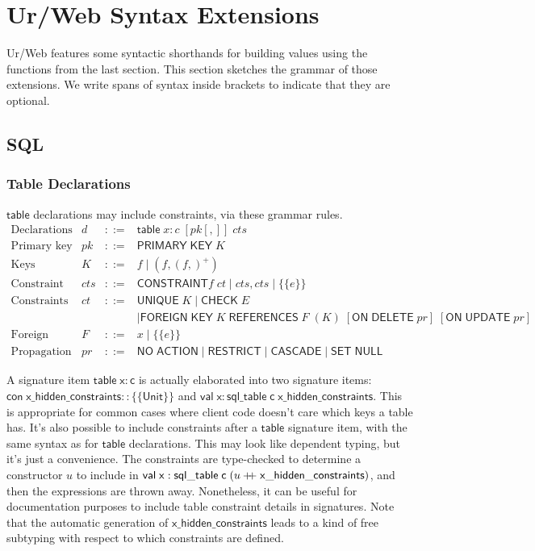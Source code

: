\documentclass{article}
\newcommand{\mt}[1]{\mathsf{#1}}
\newcommand{\rc}{+ \hspace{-.075in} + \;}
\begin{document}
\section{Ur/Web Syntax Extensions}

Ur/Web features some syntactic shorthands for building values using the functions from the last section.  This section sketches the grammar of those extensions.  We write spans of syntax inside brackets to indicate that they are optional.

\subsection{SQL}

\subsubsection{\label{tables}Table Declarations}

$\mt{table}$ declarations may include constraints, via these grammar rules.
$$\begin{array}{rrcll}
  \textrm{Declarations} & d &::=& \mt{table} \; x : c \; [pk[,]] \; cts \\
  \textrm{Primary key constraints} & pk &::=& \mt{PRIMARY} \; \mt{KEY} \; K \\
  \textrm{Keys} & K &::=& f \mid (f, (f,)^+) \\
  \textrm{Constraint sets} & cts &::=& \mt{CONSTRAINT} f \; ct \mid cts, cts \mid \{\{e\}\} \\
  \textrm{Constraints} & ct &::=& \mt{UNIQUE} \; K \mid \mt{CHECK} \; E \\
  &&& \mid \mt{FOREIGN} \; \mt{KEY} \; K \; \mt{REFERENCES} \; F \; (K) \; [\mt{ON} \; \mt{DELETE} \; pr] \; [\mt{ON} \; \mt{UPDATE} \; pr] \\
  \textrm{Foreign tables} & F &::=& x \mid \{\{e\}\} \\
  \textrm{Propagation modes} & pr &::=& \mt{NO} \; \mt{ACTION} \mid \mt{RESTRICT} \mid \mt{CASCADE} \mid \mt{SET} \; \mt{NULL}
\end{array}$$

A signature item $\mt{table} \; \mt{x} : \mt{c}$ is actually elaborated into two signature items: $\mt{con} \; \mt{x\_hidden\_constraints} :: \{\{\mt{Unit}\}\}$ and $\mt{val} \; \mt{x} : \mt{sql\_table} \; \mt{c} \; \mt{x\_hidden\_constraints}$.  This is appropriate for common cases where client code doesn't care which keys a table has.  It's also possible to include constraints after a $\mt{table}$ signature item, with the same syntax as for $\mt{table}$ declarations.  This may look like dependent typing, but it's just a convenience.  The constraints are type-checked to determine a constructor $u$ to include in $\mt{val} \; \mt{x} : \mt{sql\_table} \; \mt{c} \; (u \rc \mt{x\_hidden\_constraints})$, and then the expressions are thrown away.  Nonetheless, it can be useful for documentation purposes to include table constraint details in signatures.  Note that the automatic generation of $\mt{x\_hidden\_constraints}$ leads to a kind of free subtyping with respect to which constraints are defined.
\end{document}
